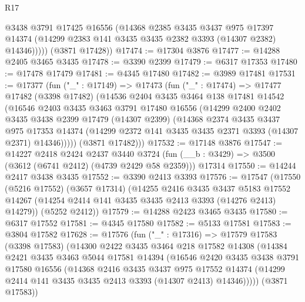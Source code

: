 \begin{lexlean}{R17}
\begin{coremodule}
            @3438
            @3791
            @17425
            @16556
            (@14368
              @2385
              @3435
              @3437
              @975
              @17397
              @14374
              (@14299 @2383 @141 @3435 @3435 @2382 @3393 (@14307 @2382) @14346)))))
      (@3871 @17428))
@17474 := @17304 @3876
@17477 := @14288 @2405 @3465 @3435
@17478 := @3390 @2399
@17479 := @6317 @17353
@17480 := @17478 @17479
@17481 := @4345 @17480
@17482 := @3989 @17481
@17531 := @17377
    (fun ("_" : @17149) =>
    @17473
      (fun ("_" : @17474) =>
      @17477
        @17482
        (@3398 @17482)
        (@14536
          @2404
          @3435
          @3464
          @138
          @17481
          @14542
          (@16546
            @2403
            @3435
            @3463
            @3791
            @17480
            @16556
            (@14299
              @2400
              @2402
              @3435
              @3438
              @2399
              @17479
              (@14307 @2399)
              (@14368
                @2374
                @3435
                @3437
                @975
                @17353
                @14374
                (@14299 @2372 @141 @3435 @3435 @2371 @3393 (@14307 @2371) @14346)))))
        (@3871 @17482)))
@17532 := @17148 @3876
@17547 := @14227
    @2418
    @2424
    @2437
    @3440
    @3724
    (fun (__b : @3429) => @3500 (@3612 (@6741 @2412) (@4739 @2429 @58 @2359)))
    @17314
@17550 := @14244 @2417 @3438 @3435
@17552 := @3390 @2413 @3393
@17576 := @17547
    (@17550
      (@5216 @17552)
      (@3657 @17314)
      (@14255
        @2416
        @3435
        @3437
        @5183
        @17552
        @14267
        (@14254 @2414 @141 @3435 @3435 @2413 @3393 (@14276 @2413) @14279))
      (@5252 @2412))
@17579 := @14288 @2423 @3465 @3435
@17580 := @6317 @17552
@17581 := @4345 @17580
@17582 := @5133 @17581
@17583 := @3804 @17582
@17628 := @17576
    (fun ("_" : @17316) =>
    @17579
      @17583
      (@3398 @17583)
      (@14300
        @2422
        @3435
        @3464
        @218
        @17582
        @14308
        (@14384
          @2421
          @3435
          @3463
          @5044
          @17581
          @14394
          (@16546
            @2420
            @3435
            @3438
            @3791
            @17580
            @16556
            (@14368
              @2416
              @3435
              @3437
              @975
              @17552
              @14374
              (@14299 @2414 @141 @3435 @3435 @2413 @3393 (@14307 @2413) @14346)))))
      (@3871 @17583))

\end{coremodule}
\end{lexlean}
